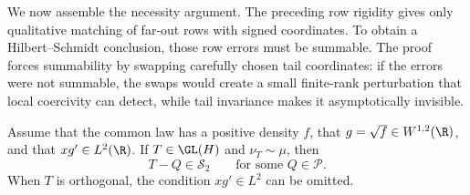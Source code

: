 We now assemble the necessity argument.
The preceding row rigidity gives only qualitative matching of far-out rows
with signed coordinates.
To obtain a Hilbert--Schmidt conclusion, those row errors must be summable.
The proof forces summability by swapping carefully chosen tail coordinates:
if the errors were not summable, the swaps would create a small finite-rank
perturbation that local coercivity can detect, while tail invariance makes
it asymptotically invisible.

\begin{lemma}
\label{lem:hilbert-schmidt-necessity}
Assume that the common law has a positive density $f$, that
$g=\sqrt f\in W^{1,2}(\R)$, and that $xg'\in L^2(\R)$.
If $T\in\GL(H)$ and $\nu_T\sim\mu$, then
\begin{equation}
 T-Q\in\mathcal S_2
 \qquad\text{for some }Q\in\mathcal P.
 \label{eq:hilbert-schmidt-necessity}
\end{equation}
When $T$ is orthogonal, the condition $xg'\in L^2$ can be omitted.
\end{lemma}
